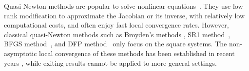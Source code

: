 \documentclass[11pt]{article}
\theoremstyle{plain}
\theoremstyle{definition}
\theoremstyle{remark}
\theoremstyle{plain}
\def\F{{\bf F}}
\def \J{{\bf J}}
\def\x{{\bf x}}
\begin{document}
Quasi-Newton methods are popular to solve nonlinear equations~\citep{yuan2011recent,yuan2022sketched,yuan2009subspace,broyden1967quasi,martinez1991quasi,broyden1967quasi,davidon1991variable,broyden1970convergence,broyden1970convergence2,davidon1991variable,fletcher1963rapidly}. 
They use low-rank modification to approximate the Jacobian or its inverse, with relatively low computational costs, and often enjoy fast local convergence rates.
However, classical quasi-Newton methods such as Broyden's methods \citep{broyden2000discovery}, 
SR1 method~\citep{broyden1967quasi,davidon1991variable}, BFGS method~\citep{broyden1970convergence,broyden1970convergence2}, and DFP method~\citep{davidon1991variable,fletcher1963rapidly} only focus on the square systems. %
The non-asymptotic local convergence of these methods has been established in recent years \citep{rodomanov2021greedy,rodomanov2021new,rodomanov2021rates,ye2022towards,liu2022quasi,lin2022explicit,liu2023symmetric,liu2023block}, while exiting results cannot be applied to more general settings.
\end{document}
